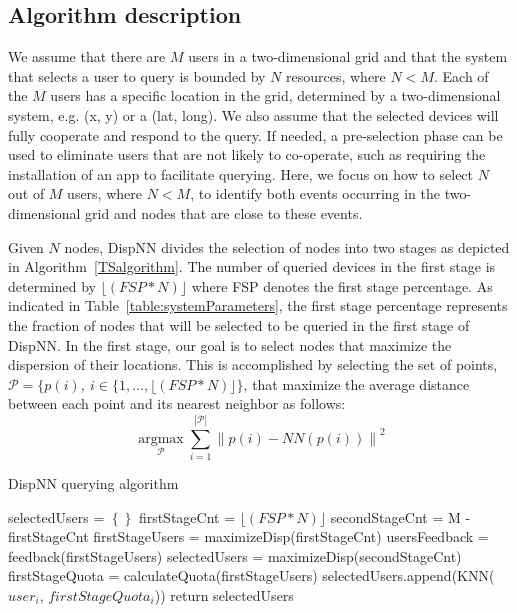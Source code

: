 \documentclass{acm_proc_article-sp}
\newcommand\floor[1]{\lfloor#1\rfloor}
\DeclareMathOperator*{\argmax}{argmax}
\newcommand{\norm}[1]{\left\lVert #1 \right\rVert}
\begin{document}
\subsection{Algorithm description}
We assume that there are $M$ users in a two-dimensional grid and that the system that selects a user to query is bounded by $N$ resources, where $N < M$.  Each of the $M$ users has a specific location in the grid, determined by a two-dimensional system, e.g. (x, y) or a (lat, long). We also assume that the selected devices will fully cooperate and respond to the query. If needed, a pre-selection phase can be used to eliminate users that are not likely to co-operate, such as requiring the installation of an app to facilitate querying. Here, we focus on how to select $N$ out of $M$ users, where $N < M$, to identify both events occurring in the two-dimensional grid and nodes that are close to these events.\par

Given $N$ nodes, DispNN divides the selection of nodes into two stages as depicted in Algorithm~\ref{TSalgorithm}. The number of queried devices in the first stage is determined by $\floor{(FSP*N)}$ where FSP denotes the first stage percentage. As indicated in Table~\ref{table:systemParameters}, the first stage percentage represents the fraction of nodes that will be selected to be queried in the first stage of DispNN. In the first stage, our goal is to select nodes that maximize the dispersion of their locations. This is accomplished by selecting the set of points, $\mathcal{P} = \{ p(i), \ i \in \{ 1,..., \floor{(FSP*N)} \}$, that maximize the average distance between each point and its nearest neighbor as follows:
\begin{equation} \label{eq:maxDisp}
\argmax\limits_{\mathcal{P}} \sum_{i=1}^{|\mathcal{P} |} \norm{p(i) - NN(p(i))}^2
\end{equation}


\begin{algorithm}[!htb]
\caption{DispNN querying algorithm}
\label{TSalgorithm}
\begin{algorithmic}[1]
       \State selectedUsers = $\left\{\right\}$
       \State firstStageCnt = $\floor{(FSP*N)}$
       \State secondStageCnt = M - firstStageCnt
       \State firstStageUsers = maximizeDisp(firstStageCnt) 
       \State usersFeedback = feedback(firstStageUsers)
              \State selectedUsers = maximizeDisp(secondStageCnt){}
       \Else
       \EndIf    
     \State firstStageQuota = calculateQuota(firstStageUsers)  
   \State selectedUsers.append(KNN($user_i$, $firstStageQuota_i$))  
 \EndFor
\State return {selectedUsers}
\EndFunction
\end{algorithmic}
\end{algorithm}
\end{document}
